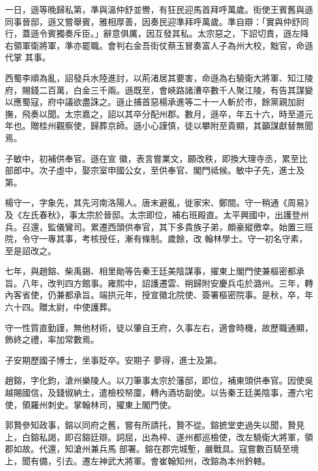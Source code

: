 \begin{pinyinscope}
 一日，遜等晚歸私第，準與溫仲舒並轡，有狂民迎馬首拜呼萬歲。街使王賓舊與遜同事晉邸，遜又嘗舉賓，雅相厚善，因奏民迎準拜呼萬歲。準自辯：「實與仲舒同行，蓋遜令賓獨奏斥臣。」辭意俱厲，因互發其私。太宗惡之，下詔切責，遜左降右領軍衛將軍，準亦罷職。會判右金吾街仗蔡玉冒奏富人子為州大校，黜官，命遜代掌
 其事。



 西蜀李順為亂，詔發兵水陸進討，以荊渚居其要害，命遜為右驍衛大將軍、知江陵府，賜錢二百萬，白金三千兩。遜既至，會峽路諸漕卒數千人聚江陵，有告其謀變以應蜀寇，府中議欲盡誅之。遜止捕首惡楊承進等二十一人斬於市，餘黨親加尉撫，飛奏以聞。太宗嘉之，詔以其卒分配州郡。數月，遜卒，年五十六，時至道元年也。贈桂州觀察使，歸葬京師。遜小心謹慎，徒以攀附至貴顯，其籲謀獻替無聞焉。



 子敏中，初補供奉官。遜在宣
 徽，表言嘗業文，願改秩，即換大理寺丞，累至比部郎中。次子虛中，娶宗室申國公女，至供奉官、閣門祗候。敏中子先，進士及第。



 楊守一，字象先，其先河南洛陽人。唐末避亂，徙家宋、鄭間。守一稍通《周易》及《左氏春秋》，事太宗於晉邸。太宗即位，補右班殿直。太平興國中，出護登州兵。召還，監儀鸞司。累遷西頭供奉官，其下多貴族子弟，頗豪縱徼幸。始置三班院，令守一專其事，考核授任，漸有條制。歲餘，改
 翰林學士。守一初名守素，至是詔改之。



 七年，與趙鎔、柴禹錫、相里勛等告秦王廷美陰謀事，擢東上閣門使兼樞密都承旨。八年，改判四方館事。雍熙中，詔護遷雲、朔歸附安慶兵屯於潞州。三年，轉內客省使，仍兼都承旨。端拱元年，授宣徽北院使、簽署樞密院事。是秋，卒，年六十四。贈太尉，中使護葬。



 守一性質直勤謹，無他材術，徒以肇自王府，久事左右，適會時機，故歷職通顯，飾終之禮，率加常數焉。



 子安期歷國子博士，坐事貶卒。安期子
 夢得，進士及第。



 趙鎔，字化鈞，滄州樂陵人。以刀筆事太宗於藩邸，即位，補東頭供奉官。因使吳越賜國信，及錢俶納土，遣檢校帑廩，轉內酒坊副使。以告秦王廷美陰事，遷六宅使，領羅州刺史。掌翰林司，擢東上閣門使。



 郭贄參知政事，鎔以同府之舊，嘗有所請托，贄不從。鎔摭堂吏過失以聞，贄見上，白鎔私謁，即召鎔廷辯。詞屈，出為梓、遂州都巡檢使，改左驍衛大將軍，領郡如故。代還，知滄州兼兵馬
 部署。鎔在郡完城塹，嚴戰具。寇嘗數百騎至境上，聞有備，引去。遷左神武大將軍。會崔翰知州，改鎔為本州鈐轄。




\end{pinyinscope}
